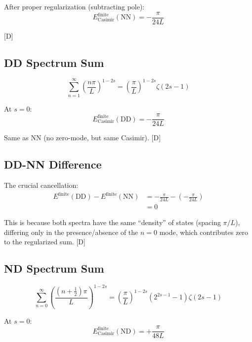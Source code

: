 \documentclass[11pt,a4paper]{article}
\newcommand{\tagD}{\textcolor{blue!70!black}{[D]}}
\begin{document}
After proper regularization (subtracting pole):
\begin{equation}
\label{eq:app-NN-finite}
E_{\text{Casimir}}^{\text{finite}}(\text{NN}) = -\frac{\pi}{24L}
\end{equation}

\tagD

\subsection{DD Spectrum Sum}

\begin{equation}
\label{eq:app-DD-sum}
\sum_{n=1}^\infty \left(\frac{n\pi}{L}\right)^{1-2s} = \left(\frac{\pi}{L}\right)^{1-2s} \zeta(2s-1)
\end{equation}

At $s = 0$:
\begin{equation}
\label{eq:app-DD-finite}
E_{\text{Casimir}}^{\text{finite}}(\text{DD}) = -\frac{\pi}{24L}
\end{equation}

Same as NN (no zero-mode, but same Casimir). \tagD

\subsection{DD-NN Difference}

The crucial cancellation:
\begin{align}
\label{eq:app-DD-NN-diff-1}
E^{\text{finite}}(\text{DD}) - E^{\text{finite}}(\text{NN}) &=
-\frac{\pi}{24L} - \left(-\frac{\pi}{24L}\right) \\
\label{eq:app-DD-NN-diff-2}
&= 0
\end{align}

This is because both spectra have the same ``density'' of states (spacing $\pi/L$),
differing only in the presence/absence of the $n = 0$ mode, which contributes
zero to the regularized sum. \tagD

\subsection{ND Spectrum Sum}

\begin{equation}
\label{eq:app-ND-sum}
\sum_{n=0}^\infty \left(\frac{(n+\tfrac{1}{2})\pi}{L}\right)^{1-2s} =
\left(\frac{\pi}{L}\right)^{1-2s} (2^{2s-1} - 1) \zeta(2s-1)
\end{equation}

At $s = 0$:
\begin{equation}
\label{eq:app-ND-finite}
E_{\text{Casimir}}^{\text{finite}}(\text{ND}) = +\frac{\pi}{48L}
\end{equation}
\end{document}
